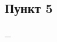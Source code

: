 \documentclass[../../main.tex]{subfiles}
\begin{document}
\subsection{Пункт 5}


\nu_\eps 
%
% 
%
%
%
%
%
%
%
%
% 
% 
% 
%
\end{document}
